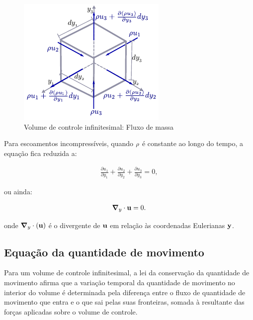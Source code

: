 \begin{figure}[!htbp]
	\caption{Volume de controle infinitesimal: Fluxo de massa}
	\begin{center}
		\includegraphics[scale=1.5,trim=0cm 0.0cm 0cm 0.0cm, clip=true]{Imagens/Cap2/volInf_fluxoMassa.pdf}	
	\end{center}
	\label{fig:volInf_fluxoMassa}
\end{figure}

Para escoamentos incompressíveis, quando $\rho$ é constante ao longo do tempo, a equação fica reduzida a:

\begin{align}
	 \frac{\partial u_{1}}{\partial y_1} + \frac{\partial u_{2}}{\partial y_2} + \frac{\partial u_{3}}{\partial y_3} = 0, 
\end{align} 

\noindent ou ainda:

\begin{align}
	\boldsymbol{\nabla}_y \cdot \mathbf{u} = 0.
	\label{eq:conser_massa_incom} 
\end{align} 

\noindent onde $\boldsymbol{\nabla}_y \cdot (\mathbf{u})$ é o divergente de $\mathbf{u}$ em relação às coordenadas Eulerianas $\mathbf{y}$.

\subsection{Equação da quantidade de movimento}

Para um volume de controle infinitesimal, a lei da conservação da quantidade de movimento afirma que a variação temporal da quantidade de movimento no interior do volume é determinada pela diferença entre o fluxo de quantidade de movimento que entra e o que sai pelas suas fronteiras, somada à resultante das forças aplicadas sobre o volume de controle.

